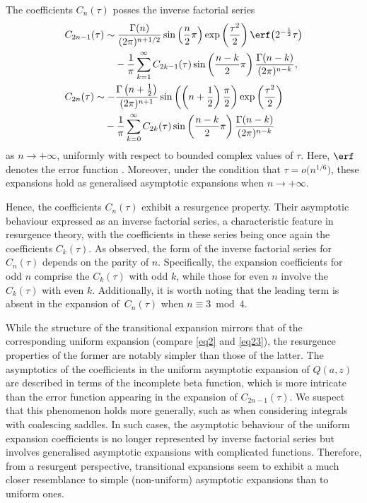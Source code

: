 \begin{Theorem}\label{thm1} The coefficients $C_n(\tau)$ posses the inverse factorial series
\begin{align}
& C_{2n - 1} (\tau ) \sim \frac{\Gamma (n)}{(2\pi )^{n + 1/2}}\sin \left( \frac{n }{2}\pi \right)\exp \left( \frac{\tau ^2 }{2} \right)\erf\big( 2^{ - \frac{1}{2}} \tau \big) \nonumber\\
&\phantom{C_{2n - 1} (\tau ) \sim}{}- \frac{1}{\pi }\sum_{k = 1}^\infty C_{2k - 1} (\tau )\sin \left( \frac{n - k}{2}\pi \right)\frac{\Gamma (n - k)}{(2\pi )^{n - k} } ,\label{eq14}
\\ &
C_{2n} (\tau ) \sim - \frac{\Gamma \left( n + \frac{1}{2} \right)}{(2\pi )^{n + 1} }\sin \left( \left( n + \frac{1}{2} \right)\frac{\pi }{2} \right)\exp \left( \frac{\tau ^2}{2} \right) \nonumber\\
&\phantom{C_{2n} (\tau ) \sim}{}- \frac{1}{\pi }\sum\limits_{k = 0}^\infty C_{2k} (\tau )\sin \left( \frac{n - k}{2}\pi \right)\frac{\Gamma (n - k)}{(2\pi )^{n - k} }\label{eq15}
\end{align}
as $n\to +\infty$, uniformly with respect to bounded complex values of $\tau$. Here, $\erf$ denotes the error function {\rm\cite[equation~(7.2.1)]{DLMF}}. Moreover, under the condition that $\tau = o\big(n^{1/6}\big)$, these expansions hold as generalised asymptotic expansions {\rm\cite[Section~2.1\,(v)]{DLMF}} when $n\to +\infty$.
\end{Theorem}

Hence, the coefficients $C_n(\tau)$ exhibit a resurgence property. Their asymptotic behaviour expressed as an inverse factorial series, a characteristic feature in resurgence theory, with the coefficients in these series being once again the coefficients $C_k(\tau)$. As observed, the form of the inverse factorial series for $C_n(\tau)$ depends on the parity of $n$. Specifically, the expansion coefficients for odd $n$ comprise the $C_k(\tau)$ with odd $k$, while those for even $n$ involve the $C_k(\tau)$ with even $k$. Additionally, it is worth noting that the leading term is absent in the expansion of~$C_n(\tau)$ when $n \equiv 3 \bmod{4}$.

While the structure of the transitional expansion mirrors that of the corresponding uniform expansion (compare \eqref{eq2} and \eqref{eq23}), the resurgence properties of the former are notably simpler than those of the latter. The asymptotics of the coefficients in the uniform asymptotic expansion of $Q(a,z)$ are described in terms of the incomplete beta function, which is more intricate than the error function appearing in the expansion of $C_{2n - 1}(\tau)$. We suspect that this phenomenon holds more generally, such as when considering integrals with coalescing saddles. In such cases, the asymptotic behaviour of the uniform expansion coefficients is no longer represented by inverse factorial series but involves generalised asymptotic expansions with complicated functions. Therefore, from a resurgent perspective, transitional expansions seem to exhibit a much closer resemblance to simple (non-uniform) asymptotic expansions than to uniform ones.

